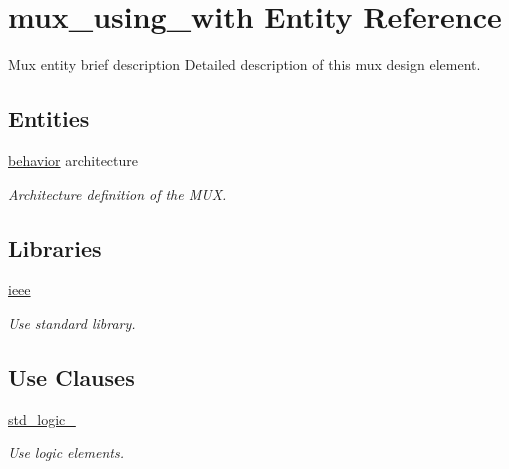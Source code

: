 \hypertarget{classmux__using__with}{}\section{mux\+\_\+using\+\_\+with Entity Reference}
\label{classmux__using__with}


Mux entity brief description Detailed description of this mux design element.  


\subsection*{Entities}
\begin{DoxyCompactItemize}
\item 
\mbox{\hyperlink{classmux__using__with_1_1behavior}{behavior}} architecture
\begin{DoxyCompactList}\small\item\em Architecture definition of the M\+UX. \end{DoxyCompactList}\end{DoxyCompactItemize}
\subsection*{Libraries}
 \begin{DoxyCompactItemize}
\item 
\mbox{\hyperlink{classmux__using__with_a44d1d60c58066d98a072e90b31c9d908}{ieee}} 
\begin{DoxyCompactList}\small\item\em Use standard library. \end{DoxyCompactList}\end{DoxyCompactItemize}
\subsection*{Use Clauses}
 \begin{DoxyCompactItemize}
\item 
\mbox{\hyperlink{classmux__using__with_ae984d6918908b859c4f9c9a950a0cfee}{std\+\_\+logic\+\_}}   
\begin{DoxyCompactList}\small\item\em Use logic elements. \end{DoxyCompactList}\end{DoxyCompactItemize}
